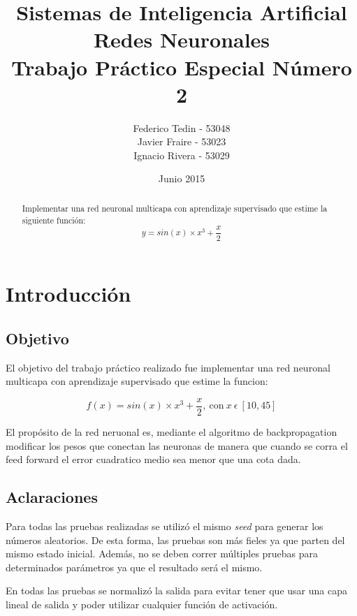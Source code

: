 \documentclass[11pt,a4paper]{article}
\title{Sistemas de Inteligencia Artificial\\Redes Neuronales\\Trabajo Práctico Especial Número 2}
\date{Junio 2015}
\author{Federico Tedin - 53048\\Javier Fraire - 53023\\Ignacio Rivera - 53029}
\begin{document}
\maketitle
\thispagestyle{empty}

\vspace{5mm}
\renewcommand{\abstractname}{Resumen:}
\begin{abstract}

\centering
Implementar una red neuronal multicapa con aprendizaje supervisado que estime la siguiente función:
$$ y = sin(x) \times x^3 + \frac{x}{2} $$
\end{abstract}

\clearpage

\renewcommand{\contentsname}{Índice}
\tableofcontents
\thispagestyle{empty}
\clearpage
\setcounter{page}{1}

\section{Introducción}
\subsection{Objetivo}

El objetivo del trabajo práctico realizado fue implementar una red neuronal multicapa con aprendizaje supervisado que estime la funcion:

$$ f(x) = sin(x) \times x^3 + \frac{x}{2}, \ \text{con} \ x \ \epsilon \ [10, 45] $$

El propósito de la red neruonal es, mediante el algoritmo de backpropagation modificar los pesos que conectan las neuronas de manera que cuando se corra el feed forward el error cuadratico medio sea menor que una cota dada.

\subsection{Aclaraciones}

Para todas las pruebas realizadas se utilizó el mismo \emph{seed} para generar los números aleatorios. De esta forma, las pruebas son más fieles ya que parten del mismo estado inicial. Además, no se deben correr múltiples pruebas para determinados parámetros ya que el resultado será el mismo. 

En todas las pruebas se normalizó la salida para evitar tener que usar una capa lineal de salida y poder utilizar cualquier función de activación.
\end{document}
